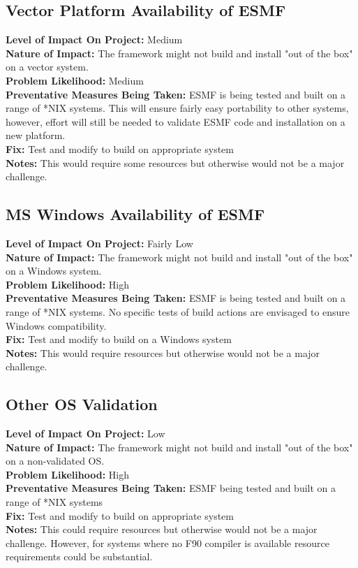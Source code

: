 \documentclass[english]{article}
\newcommand{\sreq}[1]{\subsection{\hspace{.2in}#1}}
\newenvironment
{reqlist}
{\begin{list} {} {} \rm \item[]}
{\end{list}}
\begin{document}
\sreq{Vector Platform Availability of ESMF}
\begin{reqlist}
{\bf Level of Impact On Project:} Medium \\
{\bf Nature of Impact:} The framework might not build and install "out of the box"
on a vector system.\\
{\bf Problem Likelihood:} Medium\\
{\bf Preventative Measures Being Taken:} ESMF is being tested and built on a range of *NIX systems. This will
ensure fairly easy portability to other systems, however, effort will still be needed 
to validate ESMF code and installation on a new platform. \\
{\bf Fix:} Test and modify to build on appropriate system\\
{\bf Notes:} This would require some resources but otherwise would not be a major challenge.
\end{reqlist}

\sreq{MS Windows Availability of ESMF}
\begin{reqlist}
{\bf Level of Impact On Project:} Fairly Low \\
{\bf Nature of Impact:} The framework might not build and install "out of the box"
on a Windows system.\\
{\bf Problem Likelihood:} High \\
{\bf Preventative Measures Being Taken:}  ESMF is being tested and built on a range of *NIX systems.
No specific tests of build actions are envisaged to ensure Windows compatibility.\\
{\bf Fix:} Test and modify to build on a Windows system\\
{\bf Notes:} This would require resources but otherwise would not be a major challenge.
\end{reqlist}

\sreq{Other OS Validation}
\begin{reqlist}
{\bf Level of Impact On Project:} Low \\
{\bf Nature of Impact:} The framework might not build and install "out of the box"
on a non-validated OS.\\
{\bf Problem Likelihood:} High \\
{\bf Preventative Measures Being Taken:} ESMF being tested and built on a range of *NIX systems\\
{\bf Fix:}  Test and modify to build on appropriate system\\
{\bf Notes:} This could require resources but otherwise would not be a major challenge.
However, for systems where no F90 compiler is available resource requirements could be substantial.
\end{reqlist}
\end{document}

